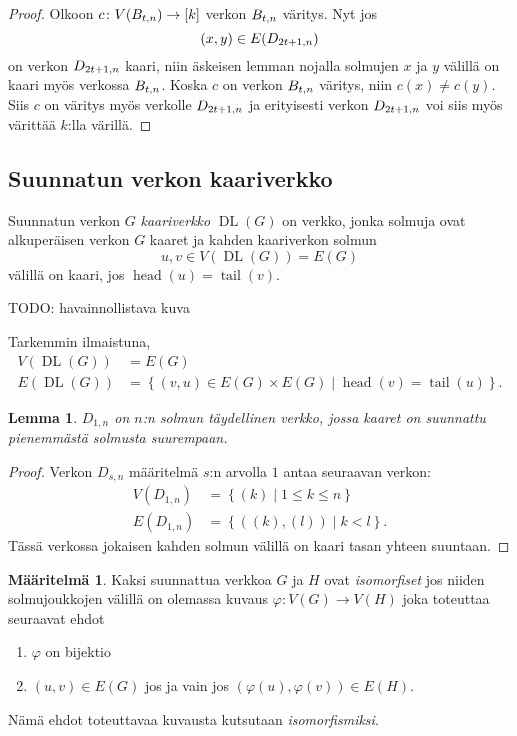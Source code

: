 \documentclass[finnish]{tktltiki2}
\newtheorem{lem}[lau]{Lemma}
\theoremstyle{definition}
\newtheorem{maar}[lau]{Määritelmä}
\theoremstyle{remark}
\newcommand{\set}[1]{\left\{ #1 \right\}}
\newcommand{\from}{\colon}
\DeclareMathOperator{\head}{head}
\DeclareMathOperator{\tail}{tail}
\DeclareMathOperator{\DL}{DL}
\newcommand{\Dsn}{D_{s,n}}
\begin{document}
\begin{proof}
    Olkoon $c \from V(\Btn) \to [k]$ verkon $B_{t,n}$ väritys. Nyt jos
    \begin{equation*}
            (x,y) \in E(D_{2t+1,n})
    \end{equation*}
    on verkon $D_{2t+1,n}$ kaari, niin äskeisen lemman nojalla solmujen $x$ ja
    $y$ välillä on kaari myös verkossa $B_{t,n}$. Koska $c$ on verkon $B_{t,n}$
    väritys, niin $c(x) \neq c(y)$. Siis $c$ on väritys myös verkolle $D_{2t+1,n}$ ja
    erityisesti verkon $D_{2t+1,n}$ voi siis myös värittää $k$:lla värillä.
\end{proof}


\subsection{Suunnatun verkon kaariverkko}

Suunnatun verkon $G$ \emph{kaariverkko} $\DL(G)$ on verkko, jonka solmuja ovat
alkuperäisen verkon $G$ kaaret ja kahden kaariverkon solmun
%
\begin{equation*}
    u,v \in V(\DL(G)) = E(G)
\end{equation*}
%
välillä on kaari, jos $\head(u) = \tail(v)$.

TODO: havainnollistava kuva

Tarkemmin ilmaistuna,
%
\begin{align*}
    V(\DL(G)) &= E(G) \\
    E(\DL(G)) &= \set{(v,u) \in E(G) \times E(G) \mid \head(v) = \tail(u)}.
\end{align*}


\begin{lem}
    $D_{1,n}$ on $n$:n solmun täydellinen verkko, jossa kaaret on suunnattu
    pienemmästä solmusta suurempaan.
\end{lem}

\begin{proof}
    Verkon $\Dsn$ määritelmä $s$:n arvolla $1$ antaa seuraavan verkon:
    \begin{align*}
        V(D_{1,n}) &= \set{(k) \mid 1 \leq k \leq n} \\
        E(D_{1,n}) &= \set{((k), (l)) \mid k < l}.
    \end{align*}
    Tässä verkossa jokaisen kahden solmun välillä on kaari tasan yhteen
    suuntaan.
\end{proof}

\begin{maar}
    Kaksi suunnattua verkkoa $G$ ja $H$ ovat \emph{isomorfiset} jos niiden
    solmujoukkojen välillä on olemassa kuvaus $\varphi \from V(G) \to V(H)$
    joka toteuttaa seuraavat ehdot
    \begin{enumerate}
        \item $\varphi$ on bijektio
        \item $(u,v) \in E(G)$ jos ja vain jos $(\varphi(u), \varphi(v)) \in
            E(H)$.
    \end{enumerate}
    Nämä ehdot toteuttavaa kuvausta kutsutaan \emph{isomorfismiksi}.
\end{maar}
\end{document}
